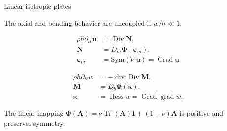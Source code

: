 \documentclass[aspectratio=169]{beamer}
\DeclareMathOperator*{\grad}{grad}
\DeclareMathOperator*{\Grad}{Grad}
\DeclareMathOperator*{\Div}{Div}
\renewcommand{\div}{\operatorname{div}}
\DeclareMathOperator*{\Hess}{Hess}
\DeclareMathOperator{\Tr}{Tr}
\begin{document}
\begin{frame}{Linear isotropic plates}
	
	The axial and bending behavior are uncoupled if $w/h \ll 1$:
	
	\begin{tcbraster}[raster columns=2, raster equal height]
		\begin{tcolorbox}[width=0.48\textwidth, nobeforeafter,  colframe=theme,title=Axial displacement \\
			(planar elastodynamics)]%
			\begin{equation*}
				\begin{aligned}
				\rho h \partial_{tt} \bm{u} &= \Div \bm{N}, \\
				\bm{N}&=D_m\bm{\Phi}(\bm{\varepsilon}_m), \\
				\bm{\varepsilon}_m &= \mathrm{Sym}(\nabla \bm{u}) = \Grad \bm{u}
				\end{aligned} 
			\end{equation*}
		\end{tcolorbox}
		\begin{tcolorbox}[width=0.48\textwidth, nobeforeafter,  colframe=theme,title=Vertical displacement\\ (Kirchhoff plate)]%
		\begin{equation*}
			\begin{aligned}
				\rho h \partial_{tt} w &= -\div\Div \bm{M}, \\
				\bm{M} &= D_b \bm{\Phi}(\bm{\kappa}), \\
				\bm{\kappa}&= \Hess w = \Grad \grad w. 
			\end{aligned}
		\end{equation*}
		\end{tcolorbox}
	\end{tcbraster}
	
	The linear mapping $\bm\Phi (\bm{A}) = \nu \Tr(\bm{A})\bm{1} + (1 - \nu) \bm{A}$ is positive and preserves symmetry.
	
\end{frame}
\end{document}

